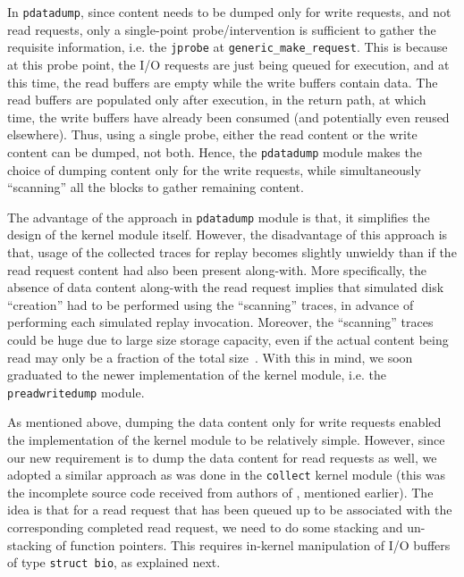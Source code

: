 In \texttt{pdatadump}, since content needs
to be dumped only for write requests, and not read requests, only a
single-point probe/intervention is sufficient to gather the requisite
information, i.e. the \texttt{jprobe} at \texttt{generic\_make\_request}.
This is because at this probe point, the I/O requests are just being queued
for execution, and at this time, the read buffers are empty while 
the write buffers contain data. The read buffers are populated only
after execution, in the return path, at which time, the write buffers
have already been consumed (and potentially even reused elsewhere).
Thus, using a single probe, either the read content or the write content
can be dumped, not both. Hence, the \texttt{pdatadump} module makes
the choice of dumping content only for the write requests, %
while simultaneously ``scanning'' all the blocks to gather remaining content.

The advantage of the approach in \texttt{pdatadump} module is that, it
simplifies the design of the kernel module itself. 
However, the disadvantage of this approach is that, usage of the 
collected traces for replay becomes slightly unwieldy than if the read 
request content had also been present along-with. More specifically,
the absence of data content along-with the read request implies that
simulated disk ``creation'' had to be performed using the ``scanning''
traces, in advance of performing each simulated replay invocation.
Moreover, the ``scanning'' traces could be huge due to large size
storage capacity, even if the actual content being read may only
be a fraction of the total size~\cite{iodedup}.
With this in mind, we soon graduated to the newer implementation of
the kernel module, i.e. the \texttt{preadwritedump} module.

As mentioned above, dumping the data content only for write requests
enabled the implementation of the kernel module to be relatively simple.
However, since our new requirement is to dump the data content for
read requests as well, we adopted a similar approach as was done in
the \texttt{collect} kernel module (this was the incomplete source code
received from authors of \cite{iodedup}, mentioned earlier).
The idea is that for a read request that has been queued up to be 
associated with the corresponding completed read request, we need to
do some stacking and un-stacking of function pointers. This requires
in-kernel manipulation of I/O buffers of type \texttt{struct bio},
as explained next.

